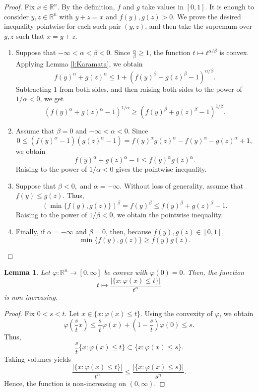 \documentclass[11pt]{amsart}
\theoremstyle{plain}
\newtheorem{lemma}[theorem]{Lemma}
\theoremstyle{definition}
\theoremstyle{remark}
\begin{document}
\begin{proof}
    Fix \(x\in\mathbb R^n\). By the definition, \(f\) and \(g\) take values in \([0,1]\). It is enough to consider \(y,z\in\mathbb R^n\) with \(y+z=x\) and \(f(y),g(z)>0\).
    We prove the desired inequality pointwise for each such pair $(y, z)$, and then take the supremum over $y,z$ such that $x=y+z$.
\begin{enumerate}[wide =0pt, labelwidth= .9cm, leftmargin=1.55cm, label=\textbf{Case \arabic*}:]
        \item Suppose that \( -\infty<\alpha<\beta<0.\)  Since $ \frac{\alpha}{\beta} \geq 1 $, the function $t \mapsto t^{\alpha / \beta}$ is convex.
    Applying Lemma \ref{l:Karamata}, we obtain
    \[
        f(y)^\alpha + g(z)^\alpha \leq 1 + (f(y)^\beta + g(z)^\beta - 1)^{\alpha / \beta}.
    \]
    Subtracting $1$ from both sides, and then raising both sides to the power of ${1} / {\alpha} <0$, we get
    \[
        \left(f(y)^\alpha + g(z)^\alpha - 1\right)^{1/\alpha} \geq (f(y)^\beta + g(z)^\beta - 1)^{1 / \beta}.
    \]
    \item Assume that $\beta =0$ and $-\infty <\alpha<0$. Since
    \[
        0 \leq (f(y)^\alpha -1)(g(z)^\alpha -  1 ) = f(y)^\alpha g(z)^\alpha - f(y)^\alpha - g(z)^\alpha + 1 ,
    \]
    we obtain
    \[
        f(y)^\alpha + g(z)^\alpha - 1 \leq f(y)^\alpha g(z)^\alpha.
    \]
    Raising to the power of ${1} / {\alpha} <0$ gives the pointwise inequality.
    \item Suppose that $\beta <0,$ and $\alpha = -\infty $. Without loss of generality, assume that $f(y) \leq g(z) .$ Thus,
    \[
        (\min \{ f(y), g(z)\})^\beta = f(y)^\beta \leq  f(y)^\beta+g(z)^\beta-1 .
    \]
    Raising to the power of ${1} / {\beta} <0$, we obtain the pointwise inequality.
    \item Finally, if $\alpha=-\infty$ and $\beta=0$, then, because $f(y), g(z) \in[0,1]$,
    \[
        \min \{f(y), g(z)\} \geq f(y) g(z).
    \]
    \end{enumerate}
\end{proof}

\begin{lemma} \label{lem:monotonicity-V}
    Let $\varphi: \mathbb{R}^n \rightarrow[0, \infty]$ be convex with $\varphi(0)=0$.  Then, the function
    \[
        t \mapsto \frac{\left|\{x: \varphi(x) \leq t\}\right|}{t^n}
    \]
    is non-increasing.
\end{lemma}

\begin{proof}
    Fix $0< s<t$. Let $x \in \{ x: \varphi (x)\leq t\}$. Using the convexity of $\varphi$, we obtain
    $$
        \varphi\left(\frac{s}{t} x\right) \leq \frac{s}{t} \varphi(x)+\left(1-\frac{s}{t}\right) \varphi(0) \leq s.
    $$
    Thus,
    $$
        \frac{s}{t} \{ x: \varphi (x)\leq t\} \subset \{ x: \varphi (x)\leq s\}.
    $$
    Taking volumes yields
$$
\frac{|\{x: \varphi(x) \leq t\}|}{t^n} \leq \frac{|\{x: \varphi(x) \leq s\}|}{s^n} .
$$
Hence, the function is non-increasing on $( 0, \infty )$.
\end{proof}
\end{document}
